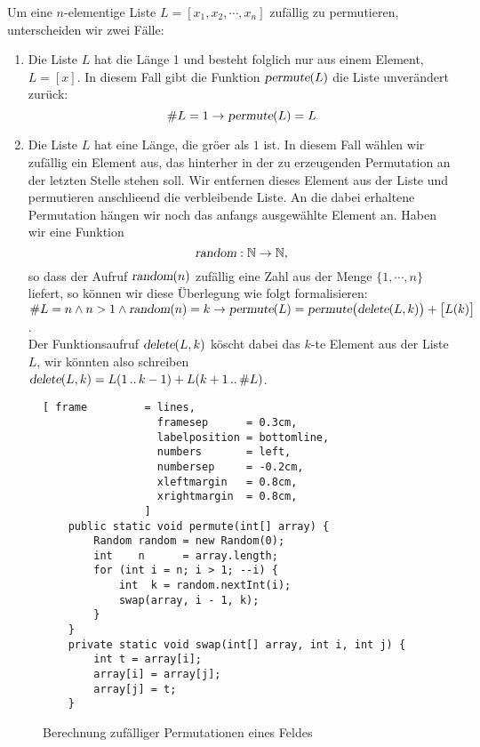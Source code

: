 Um eine $n$-elementige Liste $L = [x_1,x_2, \cdots, x_n]$ zuf\"allig zu permutieren,
unterscheiden wir zwei F\"alle:
\begin{enumerate}
\item Die Liste $L$ hat die L\"ange 1 und besteht folglich nur aus einem Element, $L = [x]$.
      In diesem Fall gibt die Funktion $\textsl{permute}(L)$ die Liste unver\"andert zur\"uck:
      \[ \#L = 1 \rightarrow \textsl{permute}(L) = L \]
\item Die Liste $L$ hat eine L\"ange, die gr\"o\3er als $1$ ist.  In diesem Fall w\"ahlen wir
      zuf\"allig ein Element aus, das hinterher  in der zu erzeugenden Permutation an der letzten Stelle
      stehen soll.  Wir entfernen dieses Element aus der Liste und permutieren
      anschlie\3end die verbleibende Liste.  An die dabei erhaltene Permutation h\"angen wir
      noch das anfangs ausgew\"ahlte Element an.  Haben wir eine Funktion
      \[ \textsl{random}: \mathbb{N} \rightarrow \mathbb{N}, \]
      so dass der Aufruf $\textsl{random}(n)$ zuf\"allig eine Zahl aus der Menge $\{1,\cdots,n\}$
      liefert, so k\"onnen wir diese Überlegung wie folgt formalisieren:
      \\[0.2cm]
      \hspace*{1.3cm}
      $ \#L = n \wedge n > 1 \wedge \textsl{random}(n) = k \rightarrow 
         \textsl{permute}(L) = \textsl{permute}\bigl(\textsl{delete}(L,k)\bigr) + \bigl[ L(k)
         \bigr]
      $.
\\[0.2cm]
      Der  Funktionsaufruf $\textsl{delete}(L,k)$ k\"oscht dabei das $k$-te Element aus der Liste $L$,
      wir k\"onnten also schreiben
      \\[0.2cm]
      \hspace*{1.3cm}
      $\textsl{delete}(L,k) = L(1\,..\,k-1) + L(k+1\,..\,\#L)$.
\end{enumerate}

\begin{figure}[!ht]
\centering
\begin{Verbatim}[ frame         = lines, 
                  framesep      = 0.3cm, 
                  labelposition = bottomline,
                  numbers       = left,
                  numbersep     = -0.2cm,
                  xleftmargin   = 0.8cm,
                  xrightmargin  = 0.8cm,
                ]
    public static void permute(int[] array) {
        Random random = new Random(0);
        int    n      = array.length;
        for (int i = n; i > 1; --i) {
            int  k = random.nextInt(i);
            swap(array, i - 1, k);
        }
    }
    private static void swap(int[] array, int i, int j) {
        int t = array[i];
        array[i] = array[j];
        array[j] = t;
    }
\end{Verbatim}
\vspace*{-0.3cm}
\caption{Berechnung zuf\"alliger Permutationen eines Feldes}
\label{fig:RandomPermutation.java}
\end{figure}

